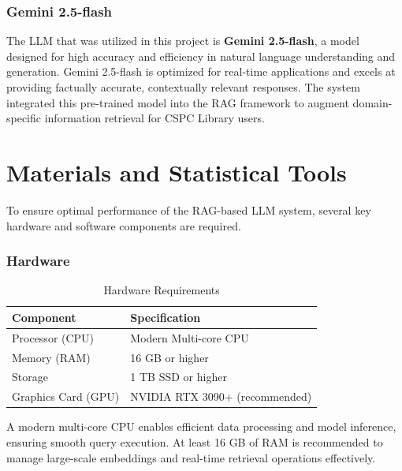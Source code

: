 \begin{refsection}
\subsubsection{Gemini 2.5-flash}

The LLM that was utilized in this project is \textbf{Gemini 2.5-flash}, a model designed for high accuracy and efficiency in natural language understanding and generation. Gemini 2.5-flash is optimized for real-time applications and excels at providing factually accurate, contextually relevant responses. The system integrated this pre-trained model into the RAG framework to augment domain-specific information retrieval for CSPC Library users.

\section{Materials and Statistical Tools}

To ensure optimal performance of the RAG-based LLM system, several key hardware and software components are required.

\subsubsection{Hardware}

\begin{table}[H]
    \centering
    \caption{Hardware Requirements}
    \label{tab:hardware_requirements}
    \begin{tabular}{ll}
        \hline
        \textbf{Component}       & \textbf{Specification}                     \\ \hline
        Processor (CPU)          & Modern Multi-core CPU                      \\
        Memory (RAM)             & 16 GB or higher                            \\
        Storage                  & 1 TB SSD or higher                         \\
        Graphics Card (GPU)      & NVIDIA RTX 3090+ (recommended)             \\
        \hline
    \end{tabular}
\end{table}

A modern multi-core CPU enables efficient data processing and model inference, ensuring smooth query execution. At least 16 GB of RAM is recommended to manage large-scale embeddings and real-time retrieval operations effectively. 


\end{refsection}
